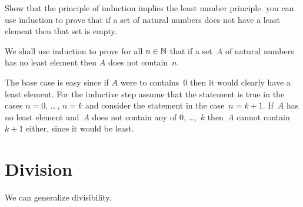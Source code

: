 \documentclass{ibl}
\begin{document}
\begin{ex}
Show that the principle of induction implies the least number 
principle.
\hint
you can use induction to prove that if a set of natural numbers does not
have a least element then that set is empty.
\begin{ans}
We shall use induction to prove for all $n\in\mathbb{N}$ that if a set~$A$ 
of natural numbers has no
least element then $A$ does not contain~$n$.

The base case is easy since if $A$ were to contains~$0$ then it would
clearly have a least element.
For the inductive step assume that the statement is true in the cases
$n=0$, \ldots\,, $n=k$ and consider the statement in the case~$n=k+1$.
If~$A$ has no least element and~$A$ does not contain any of $0$, \ldots,~$k$ 
then~$A$ cannot contain~$k+1$ either, since it would be least.   
\end{ans}
\end{ex}





\section{Division}
We can generalize divisibility.
\end{document}
